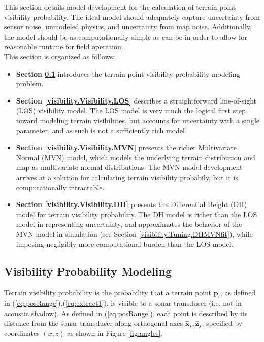 This section details model development for the calculation of terrain point visibility probability.
The ideal model should adequately capture uncertainty from sensor noise, unmodeled physics, and uncertainty from map noise.   
Additionally, the model should be as computationally simple as can be in order to allow for reasonable runtime for field operation.
\\

\noindent This section is organized as follows:

\begin{itemize}

\item \textbf{Section \ref{visibility.Visibility.Modeling}} introduces the terrain point visibility probability modeling problem.

\item \textbf{Section \ref{visibility.Visibility.LOS}} describes a straightforward line-of-sight (LOS) visibility model.
The LOS model is very much the logical first step toward modeling terrain visibiliites, but accounts for uncertainty with a single parameter, and as such is not a sufficiently rich model. 

\item \textbf{Section \ref{visibility.Visibility.MVN}} presents the richer Multivariate Normal (MVN) model, which models the underlying terrain distribution and map as multivariate normal distributions.  
The MVN model development arrives at a solution for calculating terrain visibility probabily, but it is computationally intractable.

\item \textbf{Section \ref{visibility.Visibility.DH}} presents the Differential Height (DH) model for terrain visibility probability.
The DH model is richer than the LOS model in representing uncertainty, and approximates the behavior of the MVN model in simulation (see Section \ref{visibility.Tuning.DHMVNfit}), while imposing negligibly more computational burden than the LOS model.

\end{itemize}

\subsection{Visibility Probability Modeling}
\label{visibility.Visibility.Modeling}

Terrain visibility probability is the probability that a terrain point $\textbf{p}_i$, as defined in (\ref{eq:posRange}),(\ref{eq:extract1}), is visible to a sonar transducer (i.e. not in acoustic shadow).  As defined in (\ref{eq:posRange}), each point is described by its distance from the sonar transducer along orthogonal axes $\hat{\mathbf{x}}_s, \hat{\mathbf{z}}_s$, specified by coordinates $(x,z)$ as shown in Figure \ref{fig:angles}.

